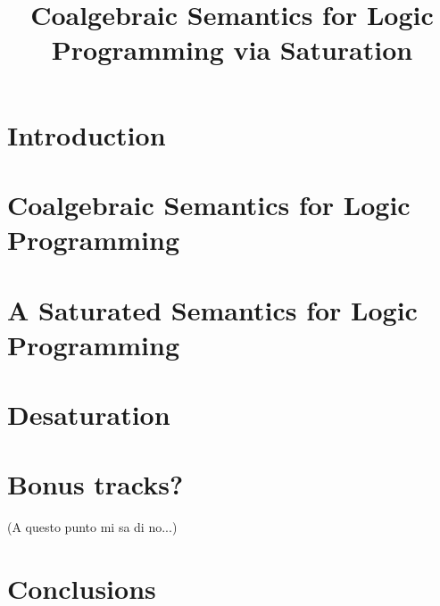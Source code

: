 \documentclass{llncs}
\begin{document}
\title{Coalgebraic Semantics for Logic Programming via Saturation}

\maketitle
{}


\section{Introduction}



\section{Coalgebraic Semantics for Logic Programming}



\section{A Saturated Semantics for Logic Programming}\label{SEC:SemLogProg}



\section{Desaturation}



\section{Bonus tracks?}
(A questo punto mi sa di no...)

\section{Conclusions}



\end{document}
